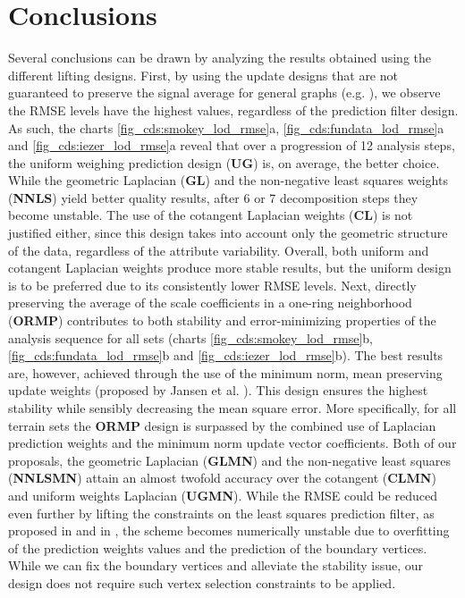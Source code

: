 \documentclass[graybox]{svmult}
\begin{document}
	\section{Conclusions}
	Several conclusions can be drawn by analyzing the results obtained using the different lifting designs. First, by using the update designs that are not guaranteed to preserve the signal average for general graphs (e.g. \cite{ Martinez2011}), we observe the RMSE levels have the highest values, regardless of the prediction filter design. As such, the charts \ref{fig_cds:smokey_lod_rmse}a, \ref{fig_cds:fundata_lod_rmse}a and \ref{fig_cds:iezer_lod_rmse}a reveal that over a progression of 12 analysis steps, the uniform weighing prediction design (\textbf{UG}) is, on average, the better choice. While the geometric Laplacian (\textbf{GL}) and the non-negative least squares weights (\textbf{NNLS}) yield better quality results, after  6 or 7 decomposition steps they become unstable. The use of the cotangent Laplacian weights (\textbf{CL}) is not justified either, since this design takes into account only the geometric structure of the data, regardless of the attribute variability. Overall, both uniform and cotangent Laplacian weights produce more stable results, but the uniform design is to be preferred due to its consistently lower RMSE levels. Next, directly preserving the average of the scale coefficients in a one-ring neighborhood (\textbf{ORMP}) contributes to both  stability and error-minimizing properties of the analysis sequence for all sets (charts \ref{fig_cds:smokey_lod_rmse}b, \ref{fig_cds:fundata_lod_rmse}b and \ref{fig_cds:iezer_lod_rmse}b). The best results are, however, achieved through the use of the minimum norm, mean preserving update weights (proposed by Jansen et al. \cite{Jansen2001}). This design ensures the highest stability while sensibly decreasing the mean square error. More specifically, for all terrain sets the \textbf{ORMP} design is surpassed by the combined use of Laplacian prediction weights and the minimum norm update vector coefficients. Both of our proposals, the geometric Laplacian (\textbf{GLMN}) and the non-negative least squares (\textbf{NNLSMN}) attain an almost twofold accuracy over the cotangent (\textbf{CLMN}) and uniform weights Laplacian (\textbf{UGMN}). While the RMSE could be reduced even further by lifting the constraints on the least squares prediction filter, as proposed in \cite{Wagner2005} and in \cite{Martinez2011}, the scheme becomes numerically unstable due to overfitting of the prediction weights values and the prediction of the boundary vertices. While we can fix the boundary vertices and alleviate the stability issue, our design does not require such vertex selection constraints to be applied.
	
\end{document}
